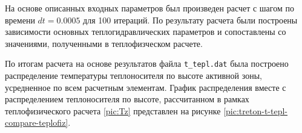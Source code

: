 
На основе описанных входных параметров был произведен расчет с шагом по времени $dt=0.0005$ для 100 итераций. По результату расчета были построены зависимости основных теплогидравлических параметров и сопоставлены со значениями, полученными в теплофизческом расчете.

По итогам расчета на основе результатов файла \texttt{t\_tepl.dat} была построено распределение температуры теплоносителя по высоте активной зоны, усредненное по всем расчетным элементам. График распределения вместе с распределением теплоносителя по высоте, рассчитанном в рамках теплофизического расчета \ref{pic:Tz} представлен на рисунке \ref{pic:treton-t-tepl-compare-teplofiz}.

